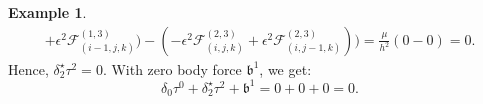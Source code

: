 \documentclass[fleqn]{article}
\theoremstyle{definition}
\newtheorem{example}[theorem]{Example}
\begin{document}
\begin{example}
\begin{subequations}
\begin{alignat}{2}
              + \epsilon^2 \mathcal{F}^{(1, 3)}_{(i - 1, j, k)}
            )
            -
            ( - \epsilon^2 \mathcal{F}^{(2, 3)}_{(i, j, k)}
              + \epsilon^2 \mathcal{F}^{(2, 3)}_{(i, j - 1, k)}
            )
          )
        = \frac{\mu}{h^2} (0  - 0)
        = 0.
    \end{alignat}
  \end{subequations}
  Hence, $\delta_2^\star \tau^2 = 0$.
  With zero body force $\mathfrak{b}^1$, we get:
  \begin{equation}
    \delta_0 \tau^0 + \delta_2^\star \tau^2 + \mathfrak{b}^1 = 0 + 0 + 0 = 0.
  \end{equation}
\end{example}
\end{document}
